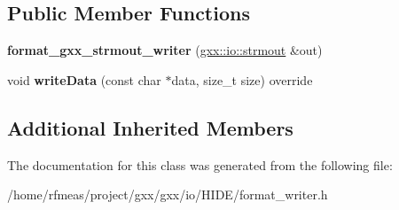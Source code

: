 \subsection*{Public Member Functions}
\begin{DoxyCompactItemize}
\item 
{\bfseries format\+\_\+gxx\+\_\+strmout\+\_\+writer} (\hyperlink{classgxx_1_1io_1_1strmout}{gxx\+::io\+::strmout} \&out)\hypertarget{classgxx_1_1io_1_1format__gxx__strmout__writer_aad66b83b1ab1ff276a3da2dce8c99e06}{}\label{classgxx_1_1io_1_1format__gxx__strmout__writer_aad66b83b1ab1ff276a3da2dce8c99e06}

\item 
void {\bfseries write\+Data} (const char $\ast$data, size\+\_\+t size) override\hypertarget{classgxx_1_1io_1_1format__gxx__strmout__writer_a9eeb277f7026b6a37552622c5e9eaac0}{}\label{classgxx_1_1io_1_1format__gxx__strmout__writer_a9eeb277f7026b6a37552622c5e9eaac0}

\end{DoxyCompactItemize}
\subsection*{Additional Inherited Members}


The documentation for this class was generated from the following file\+:\begin{DoxyCompactItemize}
\item 
/home/rfmeas/project/gxx/gxx/io/\+H\+I\+D\+E/format\+\_\+writer.\+h\end{DoxyCompactItemize}
